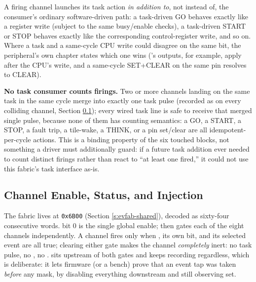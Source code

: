 A firing channel launches its task action \textit{in addition to}, not instead of, the consumer's ordinary software-driven path: a task-driven  GO behaves exactly like a register  write (subject to the same busy/enable checks), a task-driven  START or STOP behaves exactly like the corresponding control-register write, and so on. Where a task and a same-cycle CPU write could disagree on the same bit, the peripheral's own chapter states which one wins ('s  outputs, for example, apply after the CPU's write, and a same-cycle SET+CLEAR on the same pin resolves to CLEAR).

\textbf{No task consumer counts firings.} Two or more channels landing on the same task in the same cycle merge into exactly one task pulse (recorded as  on every colliding channel, Section \ref{s:evfab-map}); every wired task line is safe to receive that merged single pulse, because none of them has counting semantics: a GO, a START, a STOP, a fault trip, a tile-wake, a THINK, or a pin set/clear are all idempotent-per-cycle actions. This is a binding property of the six touched blocks, not something a driver must additionally guard: if a future task addition ever needed to count distinct firings rather than react to ``at least one fired,'' it could not use this fabric's task interface as-is.

\subsection{Channel Enable, Status, and Injection}
\label{s:evfab-map}

The fabric lives at \texttt{0x6B00} (Section \ref{s:evfab-shared}), decoded as sixty-four consecutive words.  bit 0 is the single global enable;  then gates each of the eight channels independently. A channel fires only when , its own  bit, and its selected event are all true; clearing either gate makes the channel \textit{completely} inert: no task pulse, no , no .  sits upstream of both gates and keeps recording regardless, which is deliberate: it lets firmware (or a bench) prove that an event tap was taken \textit{before} any mask, by disabling everything downstream and still observing  set.

